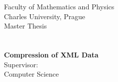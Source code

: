 \begin{titlepage}
\begin{center}
\large{Faculty of Mathematics and Physics\\
Charles University, Prague} \\\vspace{1cm}
\LARGE{Master Thesis} \\\vspace{1cm}
\\\vspace{1cm}
\Large{\VT{}}\\\bigskip
\LARGE{\textbf{Compression of XML Data}}
\vfill
\large{\KSI{}\\
Supervisor: \Pokorny{}\\
Computer Science}
\end{center}
\end{titlepage}
